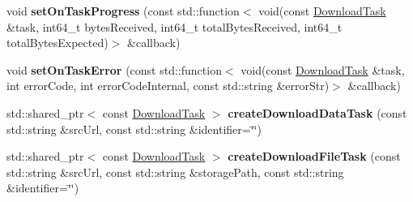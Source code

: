 \begin{DoxyCompactItemize}
\item 
\mbox{\label{classcocos2d_1_1network_1_1Downloader_a2c74651509aa072c3acd07356ad6e0ec}} 
void {\bfseries set\+On\+Task\+Progress} (const std\+::function$<$ void(const \hyperlink{classcocos2d_1_1network_1_1DownloadTask}{Download\+Task} \&task, int64\+\_\+t bytes\+Received, int64\+\_\+t total\+Bytes\+Received, int64\+\_\+t total\+Bytes\+Expected)$>$ \&callback)
\item 
\mbox{\label{classcocos2d_1_1network_1_1Downloader_a03afdaa81dcb69299cb80eb2d850273a}} 
void {\bfseries set\+On\+Task\+Error} (const std\+::function$<$ void(const \hyperlink{classcocos2d_1_1network_1_1DownloadTask}{Download\+Task} \&task, int error\+Code, int error\+Code\+Internal, const std\+::string \&error\+Str)$>$ \&callback)
\item 
\mbox{\label{classcocos2d_1_1network_1_1Downloader_a8b6f360e9c3ff1dee201011afb3b82fe}} 
std\+::shared\+\_\+ptr$<$ const \hyperlink{classcocos2d_1_1network_1_1DownloadTask}{Download\+Task} $>$ {\bfseries create\+Download\+Data\+Task} (const std\+::string \&src\+Url, const std\+::string \&identifier=\char`\"{}\char`\"{})
\item 
\mbox{\label{classcocos2d_1_1network_1_1Downloader_aafd6043f7cce6502a50416a067b41d33}} 
std\+::shared\+\_\+ptr$<$ const \hyperlink{classcocos2d_1_1network_1_1DownloadTask}{Download\+Task} $>$ {\bfseries create\+Download\+File\+Task} (const std\+::string \&src\+Url, const std\+::string \&storage\+Path, const std\+::string \&identifier=\char`\"{}\char`\"{})
\end{DoxyCompactItemize}
